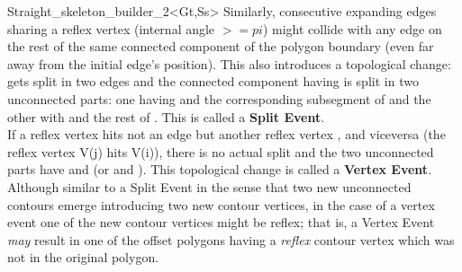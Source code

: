 \begin{ccRefClass}{Straight_skeleton_builder_2<Gt,Ss>}
Similarly, consecutive expanding edges  sharing a reflex vertex (internal angle $>=pi$) might collide with any edge  on the rest of the same connected component of the polygon boundary (even far away from the initial edge's position). This also introduces a topological change:  gets split in two edges and the connected component having  is split in two unconnected parts: one having  and the corresponding subsegment of  and the other with  and the rest of . This is called a \textbf{Split Event}.\\ If a reflex vertex hits not an edge  but another reflex vertex , and viceversa (the reflex vertex V(j) hits V(i)), there is no actual split and the two unconnected parts have  and  (or  and ). This topological change is called a \textbf{Vertex Event}. Although similar to a Split Event in the sense that two new unconnected contours emerge introducing two new contour vertices, in the case of a vertex event one of the new contour vertices might be reflex; that is, a Vertex Event \textit{may} result in one of the offset polygons having a \textit{reflex} contour vertex which was not in the original polygon.


\end{ccRefClass}

